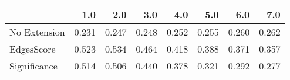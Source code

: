 \begin{tabular}{lrrrrrrr}
\toprule
{} &   1.0 &   2.0 &   3.0 &   4.0 &   5.0 &   6.0 &   7.0 \\
\midrule
No Extension & 0.231 & 0.247 & 0.248 & 0.252 & 0.255 & 0.260 & 0.262 \\
EdgesScore   & 0.523 & 0.534 & 0.464 & 0.418 & 0.388 & 0.371 & 0.357 \\
Significance & 0.514 & 0.506 & 0.440 & 0.378 & 0.321 & 0.292 & 0.277 \\
\bottomrule
\end{tabular}
